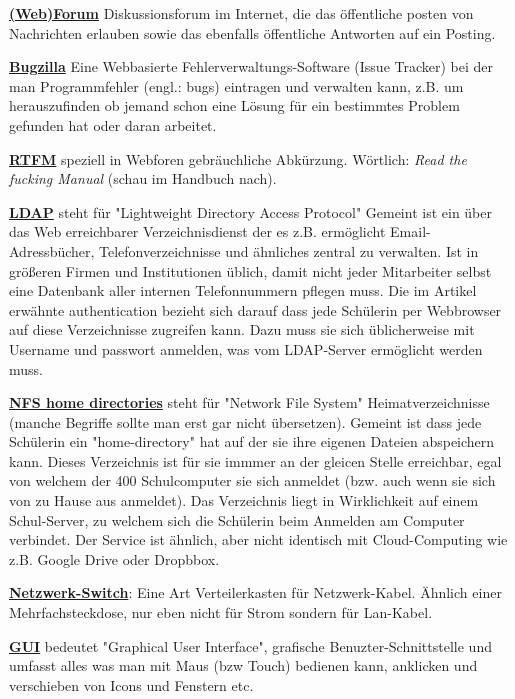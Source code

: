 \documentclass[10pt,a4paper,ngerman,twoside]{article} %
\begin{document}
\href{http://de.wikipedia.org/wiki/Webforum}{\textbf{(Web)Forum}} Diskussionsforum im Internet, die das öffentliche posten von Nachrichten erlauben sowie das ebenfalls öffentliche Antworten auf ein Posting. 

\href{http://de.wikipedia.org/wiki/Bugzilla}{\textbf{Bugzilla}} Eine Webbasierte Fehlerverwaltungs-Software (Issue Tracker) bei der man Programmfehler (engl.: bugs) eintragen und verwalten kann, z.B. um herauszufinden ob jemand schon eine Lösung für ein bestimmtes Problem gefunden hat oder daran arbeitet. 

\href{https://en.wikipedia.org/wiki/Rtfm}{\textbf{RTFM}} speziell in Webforen gebräuchliche Abkürzung. Wörtlich: \textit{Read the fucking Manual} (schau im Handbuch nach). 

\href{http://en.wikipedia.org/wiki/Ldap}{\textbf{LDAP}} steht für "Lightweight Directory Access Protocol" Gemeint ist ein über das Web erreichbarer Verzeichnisdienst der es z.B. ermöglicht Email-Adressbücher, Telefonverzeichnisse und ähnliches zentral zu verwalten. Ist in größeren Firmen und Institutionen üblich, damit nicht jeder Mitarbeiter selbst eine Datenbank aller internen Telefonnummern pflegen muss. Die im Artikel erwähnte authentication bezieht sich darauf dass jede Schülerin per Webbrowser auf diese Verzeichnisse zugreifen kann. Dazu muss sie sich üblicherweise mit Username und passwort anmelden, was vom LDAP-Server ermöglicht werden muss. 

\href{http://de.wikipedia.org/wiki/Network_File_System}{\textbf{NFS home directories}} steht für "Network File System" Heimatverzeichnisse (manche Begriffe sollte man erst gar nicht übersetzen). Gemeint ist dass jede Schülerin ein "home-directory" hat auf der sie ihre eigenen Dateien abspeichern kann. Dieses Verzeichnis ist für sie immmer an der gleicen Stelle erreichbar, egal von welchem der 400 Schulcomputer sie sich anmeldet (bzw. auch wenn sie sich von zu Hause aus anmeldet). Das Verzeichnis liegt in Wirklichkeit auf einem Schul-Server, zu welchem sich die Schülerin beim Anmelden am Computer verbindet. Der Service ist ähnlich, aber nicht identisch mit Cloud-Computing wie z.B. Google Drive oder Dropbbox. 

\href{http://de.wikipedia.org/wiki/Switch_(Netzwerktechnik)}{\textbf{Netzwerk-Switch}}: Eine Art Verteilerkasten für Netzwerk-Kabel. Ähnlich einer Mehrfachsteckdose, nur eben nicht für Strom sondern für Lan-Kabel. 

\href{http://en.wikipedia.org/wiki/Graphical_user_interface}{\textbf{GUI}} bedeutet "Graphical User Interface", grafische Benuzter-Schnittstelle und umfasst alles was man mit Maus (bzw Touch) bedienen kann, anklicken und verschieben von Icons und Fenstern etc.
\end{document}
